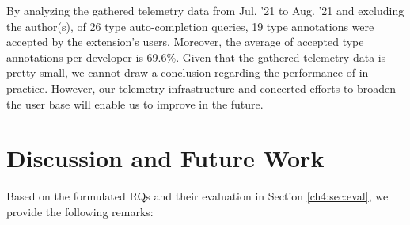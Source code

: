 By analyzing the gathered telemetry data from Jul. '21 to Aug. '21 and excluding the author(s), of 26 type auto-completion queries, 19 type annotations were accepted by the extension's users. Moreover, the average of accepted type annotations per developer is 69.6\%. Given that the gathered telemetry data is pretty small, we cannot draw a conclusion regarding the performance of \name in practice. However, our telemetry infrastructure and concerted efforts to broaden the user base will enable us to improve \name in the future.

\section{Discussion and Future Work}\label{ch4:sec:discuss}
Based on the formulated RQs and their evaluation in Section \ref{ch4:sec:eval}, we provide the following remarks:
